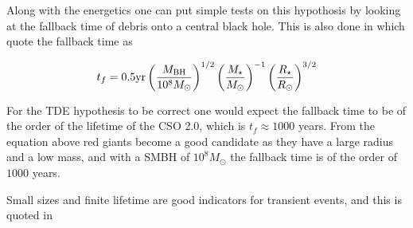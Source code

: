 
Along with the energetics one can put simple tests on this hypothosis by looking at the fallback time of debris onto a central black hole. This is also done in \cite{sullivan2024smallscale} which quote the fallback time as 

\begin{equation}
    t_f = 0.5 \text{yr}\left(\frac{M_{\rm BH}}{10^8 M_{\odot}}\right)^{1/2}\left(\frac{M_\star}{M_{\odot}}\right)^{-1}\left(\frac{R_\star}{R_{\odot}}\right)^{3/2}
\end{equation}

For the TDE hypothesis to be correct one would expect the fallback time to be of the order of the lifetime of the CSO 2.0, which is $t_f \approx 1000$ years. From the equation above red giants become a good candidate as they have a large radius and a low mass, and with a SMBH of $10^8 M_{\odot}$ the fallback time is of the order of $1000$ years.

Small sizes and finite lifetime are good indicators for transient events, and this is quoted in \cite{sullivan2024smallscale}





